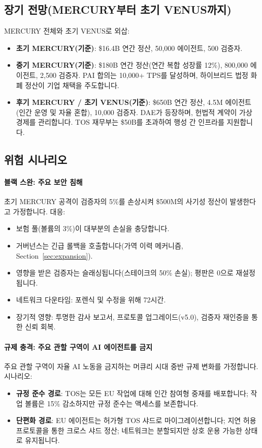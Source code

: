 \documentclass[11pt]{article}
\begin{document}
\subsection{장기 전망(MERCURY부터 초기 VENUS까지)}
MERCURY 전체와 초기 VENUS로 외삽:
\begin{itemize}[noitemsep]
  \item \textbf{초기 MERCURY(기준)}: \$16.4B 연간 정산, 50,000 에이전트, 500 검증자.
  \item \textbf{중기 MERCURY(기준)}: \$180B 연간 정산(연간 복합 성장률 12\%), 800,000 에이전트, 2,500 검증자. PAI 합의는 10,000+ TPS를 달성하며, 하이브리드 법정 화폐 정산이 기업 채택을 주도합니다.
  \item \textbf{후기 MERCURY / 초기 VENUS(기준)}: \$650B 연간 정산, 4.5M 에이전트(인간 운영 및 자율 혼합), 10,000 검증자. DAE가 등장하며, 헌법적 계약이 가상 경제를 관리합니다. TOS 재무부는 \$50B를 초과하여 행성 간 인프라를 지원합니다.
\end{itemize}

\subsection{위험 시나리오}
\paragraph{블랙 스완: 주요 보안 침해}
초기 MERCURY 공격이 검증자의 5\%를 손상시켜 \$500M의 사기성 정산이 발생한다고 가정합니다. 대응:
\begin{itemize}[noitemsep]
  \item 보험 풀(볼륨의 3\%)이 대부분의 손실을 충당합니다.
  \item 거버넌스는 긴급 롤백을 호출합니다(가역 이력 메커니즘, Section~\ref{sec:expansion}).
  \item 영향을 받은 검증자는 슬래싱됩니다(스테이크의 50\% 손실); 평판은 0으로 재설정됩니다.
  \item 네트워크 다운타임: 포렌식 및 수정을 위해 72시간.
  \item 장기적 영향: 투명한 감사 보고서, 프로토콜 업그레이드(v5.0), 검증자 재인증을 통한 신뢰 회복.
\end{itemize}

\paragraph{규제 충격: 주요 관할 구역이 AI 에이전트를 금지}
주요 관할 구역이 자율 AI 노동을 금지하는 머큐리 시대 중반 규제 변화를 가정합니다. 시나리오:
\begin{itemize}[noitemsep]
  \item \textbf{규정 준수 경로}: TOS는 모든 EU 작업에 대해 인간 참여형 중재를 배포합니다; 작업 볼륨은 15\% 감소하지만 규정 준수는 액세스를 보존합니다.
  \item \textbf{단편화 경로}: EU 에이전트는 허가형 TOS 샤드로 마이그레이션합니다; 지연 허용 프로토콜을 통한 크로스 샤드 정산; 네트워크는 분할되지만 상호 운용 가능한 상태로 유지됩니다.
\end{itemize}
\end{document}
